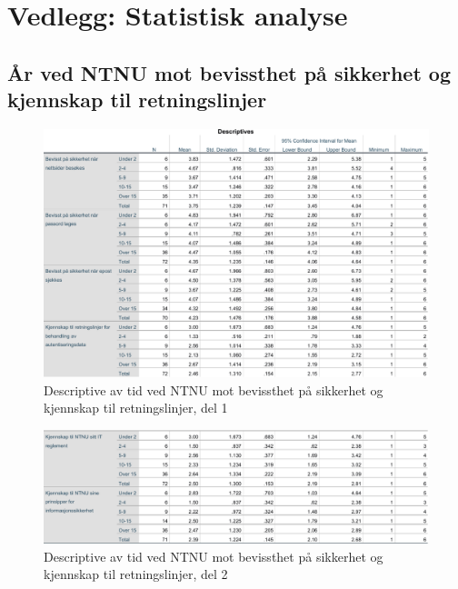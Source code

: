 \chapter{Vedlegg: Statistisk analyse}
\label{vedlegg:statanalys}

\section*{År ved NTNU mot bevissthet på sikkerhet og kjennskap til retningslinjer}
\label{aarvedNTNU-mot-bevissthetogkjennskap}
\begin{figure}[H]
    \centering
    \includegraphics[scale=0.7]{case_2/bilder/spss/anova_ttest/ansiennitet_bevissthetogkjennskap_descriptive_1.pdf}
    \caption[ansiennitet-bevissthetogkjennskap-descriptive-1]{Descriptive av tid ved NTNU mot bevissthet på sikkerhet og kjennskap til retningslinjer, del 1}
    \label{fig:ansiennitet-bevissthetogkjennskap-descriptive-1}
\end{figure}

\begin{figure}[H]
    \centering
    \includegraphics[scale=0.7]{case_2/bilder/spss/anova_ttest/ansiennitet_bevissthetogkjennskap_descriptive_2.pdf}
    \caption[ansiennitet-bevissthetogkjennskap-descriptive-1]{Descriptive av tid ved NTNU mot bevissthet på sikkerhet og kjennskap til retningslinjer, del 2}
    \label{fig:ansiennitet-bevissthetogkjennskap-descriptive-2}
\end{figure}

